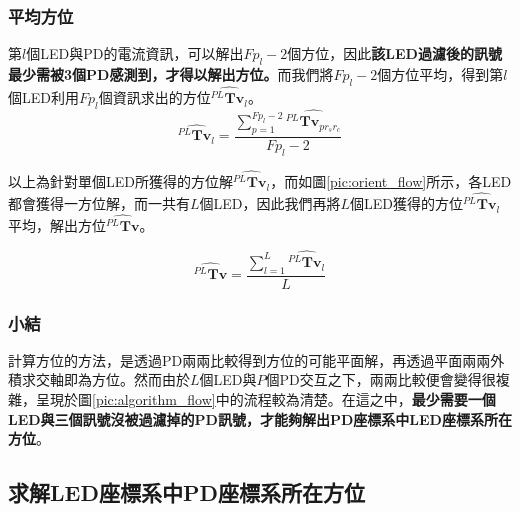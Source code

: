     \subsubsection{平均方位}
    \label{chp:orient_average}


        第$l$個LED與PD的電流資訊，可以解出$Fp_l-2$個方位，因此\textbf{該LED過濾後的訊號最少需被3個PD感測到，才得以解出方位。}而我們將$Fp_l-2$個方位平均，得到第$l$個LED利用$Fp_l$個資訊求出的方位$\hat{{^{PL}\boldsymbol{Tv}}_{l}}$。
        \begin{equation}
            \label{eqn:average_orient_led}
            \hat{{^{PL}\boldsymbol{Tv}}_{l}} = \frac{\sum^{Fp_l-2}_{p=1}\hat{{^{PL}\boldsymbol{Tv}}_{p{r_sr_c}}}}{Fp_l-2}
        \end{equation}

        \noindent 以上為針對單個LED所獲得的方位解$\hat{{^{PL}\boldsymbol{Tv}}_{l}}$，而如圖\ref{pic:orient_flow}所示，各LED都會獲得一方位解，而一共有$L$個LED，因此我們再將$L$個LED獲得的方位$\hat{{^{PL}\boldsymbol{Tv}}_{l}}$平均，解出方位$\hat{{^{PL}\boldsymbol{Tv}}}$。

        \begin{equation}
            \label{eqn:average_orient}
            \hat{{^{PL}\boldsymbol{Tv}}} = \frac{\sum^{L}_{l=1}\hat{{^{PL}\boldsymbol{Tv}}_{l}}}{L}
        \end{equation}
        
        
    \subsubsection{小結}
    \label{chp:orient_conclu}

    計算方位的方法，是透過PD兩兩比較得到方位的可能平面解，再透過平面兩兩外積求交軸即為方位。然而由於$L$個LED與$P$個PD交互之下，兩兩比較便會變得很複雜，呈現於圖\ref{pic:algorithm_flow}中的流程較為清楚。在這之中，\textbf{最少需要一個LED與三個訊號沒被過濾掉的PD訊號，才能夠解出PD座標系中LED座標系所在方位}。

        
    \subsection{求解LED座標系中PD座標系所在方位}
    \label{chp:solve_theta}

